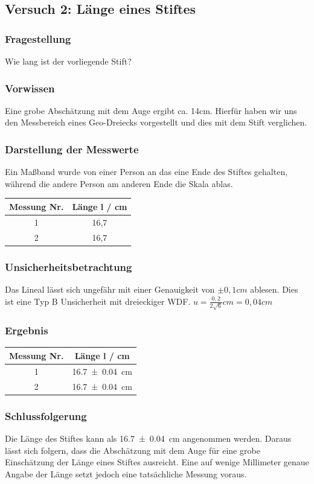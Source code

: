 \documentclass[
	a4paper,
	12pt,
	pagesize,
	ngerman
]{scrartcl}
\begin{document}
	\newpage
	\subsection{Versuch 2: Länge eines Stiftes}
	
	\subsubsection{Fragestellung}
	Wie lang ist der vorliegende Stift?
	\subsubsection{Vorwissen}
	Eine grobe Abschätzung mit dem Auge ergibt ca. 14\si{cm}. Hierfür haben wir uns den Messbereich eines Geo-Dreiecks vorgestellt und dies mit dem Stift verglichen.
	\subsubsection{Darstellung der Messwerte}
	Ein Maßband wurde von einer Person an das eine Ende des Stiftes gehalten, während die andere Person am anderen Ende die Skala ablas.

	\begin{tabular}{| c | c |}
		\hline
		Messung Nr. & Länge l  / \si{cm}\\ \hline
		1 & 16,7\\
		2 & 16,7\\ \hline
	\end{tabular}
	\subsubsection{Unsicherheitsbetrachtung}
	Das Lineal lässt sich ungefähr mit einer Genauigkeit von $\pm 0,1 \si{cm}$ ablesen. Dies ist eine Typ B Unsicherheit mit dreieckiger WDF.
	$u=\frac{0,2}{2 \sqrt{6}} \si{cm}=0,04 \si{cm}$
	\subsubsection{Ergebnis}
	\begin{tabular}{| c | c |}
		\hline
		Messung Nr. & Länge l  / \si{cm}\\ \hline
		1 & \SI{16,7 \pm 0,04}{cm}\\
		2 & \SI{16,7 \pm 0,04}{cm}\\ \hline
	\end{tabular}
	\subsubsection{Schlussfolgerung}
	Die Länge des Stiftes kann als \SI{16,7 \pm 0,04}{cm} angenommen werden. Daraus lässt sich folgern, dass die Abschätzung mit dem Auge für eine grobe Einschätzung der Länge eines Stiftes ausreicht. Eine auf wenige Millimeter genaue Angabe der Länge setzt jedoch eine tatsächliche Messung voraus.
	\newpage
\end{document}
